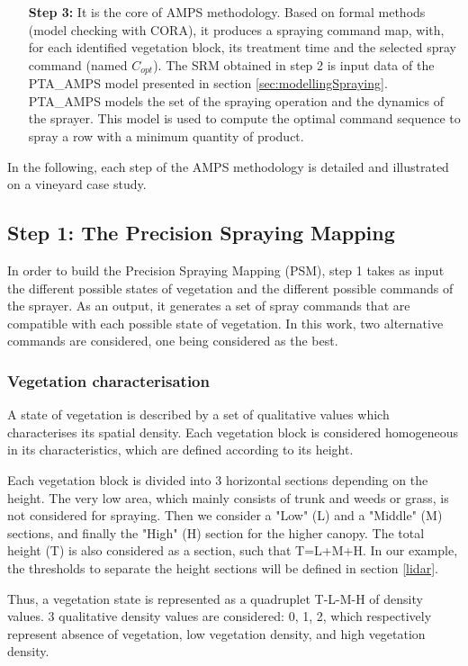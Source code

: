 \documentclass[preprint,3p,times,twocolumn]{elsarticle}
\begin{document}
\begin{itemize}
\item [\textbf{Step 3:}] It is the core of AMPS methodology. Based on formal methods (model checking with CORA), it produces a spraying command map, with, for each identified vegetation block, its treatment time and the selected spray command (named $C_{opt}$). The SRM obtained in step 2 is input data of the PTA\_AMPS model presented in section \ref{sec:modellingSpraying}. PTA\_AMPS models the set of the spraying operation and the dynamics of the sprayer. This model is used to compute the optimal command sequence to spray a row with a minimum quantity of product.

\end{itemize}

In the following, each step of the AMPS methodology is detailed and illustrated on a vineyard case study.


\subsection{Step 1: The Precision Spraying Mapping}
\label{step1}

In order to build the Precision Spraying Mapping (PSM), step 1 takes as input the different possible states of vegetation and the different possible commands of the sprayer. As an output, it generates a set of spray commands that are compatible with each possible state of vegetation. In this work, two alternative commands are considered, one being considered as the best.

\subsubsection{Vegetation characterisation \label{sec:vegcar}}
A state of vegetation is described by a set of qualitative values which characterises its spatial density. Each vegetation block is considered homogeneous in its characteristics, which are defined according to its height. 

Each vegetation block is divided into 3 horizontal sections depending on the height. The very low area, which mainly consists of trunk and weeds or grass, is not considered for spraying. Then we consider a "Low" (L) and a "Middle" (M) sections, and finally the "High" (H) section for the higher canopy. The total height (T) is also considered as a section, such that T=L+M+H. In our example, the thresholds to separate the height sections will be defined in section \ref{lidar}.

Thus, a vegetation state is represented as a quadruplet T-L-M-H of density values. 3 qualitative density values are considered: 0, 1, 2, which respectively represent absence of vegetation, low vegetation density, and high vegetation density. 
\end{document}
